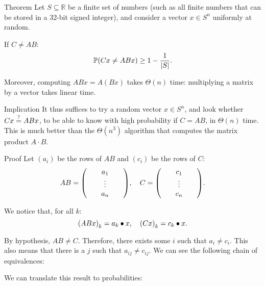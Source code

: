 \documentclass[a4paper]{article}
\begin{document}
\begin{parag}{Theorem}
    Let $S \subseteq \mathbb{R}$ be a finite set of numbers (such as all finite numbers that can be stored in a 32-bit signed integer), and consider a vector $x \in S^{n}$ uniformly at random.

    If $C \neq AB$:
    \[\prob\left(Cx \neq ABx\right) \geq 1 - \frac{1}{\left|S\right|}.\]

    Moreover, computing $ABx = A\left(Bx\right)$ takes $\Theta\left(n\right)$ time: multiplying a matrix by a vector takes linear time.

    \begin{subparag}{Implication}
        It thus suffices to try a random vector $x \in S^n$, and look whether $Cx \over{=}{?}  ABx$, to be able to know with high probability if $C = AB$, in $\Theta\left(n\right)$ time. This is much better than the $\Theta\left(n^3\right)$ algorithm that computes the matrix product $A\cdot B$.
    \end{subparag}

    \begin{subparag}{Proof}
        Let $\left(a_i\right)$ be the rows of $AB$ and $\left(c_i\right)$ be the rows of $C$: 
        \[AB = \begin{pmatrix}  &  & a_1 &  &  \\  &  & \vdots &  &  \\  &  & a_n &  &  \end{pmatrix}, \mathspace C = \begin{pmatrix}  &  & c_1 &  &  \\  &  & \vdots &  &  \\  &  & c_n &  &  \end{pmatrix}.\]

        We notice that, for all $k$: 
        \[\left(ABx\right)_k = a_k \dotprod x, \mathspace \left(C x\right)_k = c_k \dotprod x.\]

        By hypothesis, $AB \neq C$. Therefore, there exists some $i$ such that $a_i \neq c_i$. This also means that there is a $j$ such that $a_{ij} \neq c_{ij}$. We can see the following chain of equivalences:
         
        We can translate this result to probabilities:


\end{subparag}
\end{parag}
\end{document}
